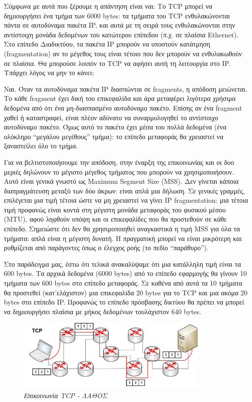 Σύμφωνα με αυτά που ξέρουμε η απάντηση είναι ναι: Το TCP μπορεί να δημιουργήσει ένα τμήμα των 6000 bytes: τα τμήματα του TCP ενθυλακώνονται πάντα σε αυτοδύναμα πακέτα IP, και αυτά με τη σειρά τους ενθυλακώνονται στην αντίστοιχη μονάδα δεδομένων του κατώτερου επίπεδου (π.χ. σε πλαίσια Ethernet). Στο επίπεδο Διαδικτύου, τα πακέτα IP μπορούν να υποστούν κατάτμηση (fragmentation) αν το μέγεθος τους είναι τέτοιο που δεν μπορούν να ενθυλακωθούν σε πλαίσια. Θα μπορούσε λοιπόν το TCP να αφήσει αυτή τη λειτουργία στο IP. Υπάρχει λόγος να μην το κάνει;

Ναι. Όταν τα αυτοδύναμα πακέτα IP διασπώνται σε fragments, η απόδοση μειώνεται. Το κάθε fragment έχει δική του επικεφαλίδα και άρα μεταφέρει λιγότερα χρήσιμα δεδομένα από ότι ένα μη-διασπασμένο αυτοδύναμο πακέτο. Επίσης αν ένα fragment χαθεί ή καταστραφεί, είναι πλέον αδύνατο να συναρμολογηθεί το αντίστοιχο αυτοδύναμο πακέτο. Όμως αυτό το πακέτο έχει μέσα του πολλά δεδομένα (ένα ολόκληρο ``μεγάλου μεγέθους'' τμήμα): το επίπεδο μεταφοράς θα χρειαστεί να ξαναστείλει όλο το τμήμα.

Για να βελτιστοποιήσουμε την απόδοση, στην έναρξη της επικοινωνίας και οι δυο μεριές δηλώνουν το μέγιστο μέγεθος τμήματος που μπορούν να χρησιμοποιήσουν. Αυτό είναι γενικά γνωστό ως Maximum Segment Size (MSS). Δεν γίνεται κάποια διαπραγμάτευση μεταξύ των δύο άκρων: είναι απλά μια δήλωση. Σε γενικές γραμμές, επιλέγεται μια τιμή τέτοια ώστε να μη χρειαστεί να γίνει IP fragmentation: μια τέτοια τιμή προφανώς είναι κοντά στη μέγιστη μονάδα μεταφοράς του φυσικού μέσου (MTU), αφού ληφθούν υπόψη και οι επικεφαλίδες που θα προστεθούν σε κάθε επίπεδο. Σημειώστε ότι δεν θα χρησιμοποιηθεί αναγκαστικά η τιμή MSS για όλα τα τμήματα: απλά είναι η μέγιστη δυνατή. Η πραγματική μπορεί να είναι μικρότερη και ρυθμίζεται από παράγοντες όπως ο έλεγχος ροής (το πεδίο ``παράθυρο'').

Στο παράδειγμα μας, έστω ότι τελικά ανακαλύψαμε ότι μια κατάλληλη τιμή είναι τα 600 bytes. Τα αρχικά δεδομένα (6000 bytes) από το επίπεδο εφαρμογής θα γίνουν 10 τμήματα των 600 bytes στο επίπεδο μεταφοράς. Σε καθένα από αυτά τα 10 τμήματα θα προστεθεί (κατ'ελάχιστον) μια επικεφαλίδα 20 bytes για το TCP και μια ακόμα 20 bytes στο επίπεδο IP. Προφανώς το επίπεδο πρόσβασης δικτύου θα πρέπει να μπορεί να δημιουργήσει πλαίσια με μήκος δεδομένων τουλάχιστον 640 bytes.

\begin{figure}[!ht]
 \centering
 \includegraphics[width=0.85\textwidth]{images/chapter4/4-1-w}
 \caption {\textsl{Επικοινωνία TCP - ΛΑΘΟΣ}}
 \label{4-1-w}
\end{figure}

